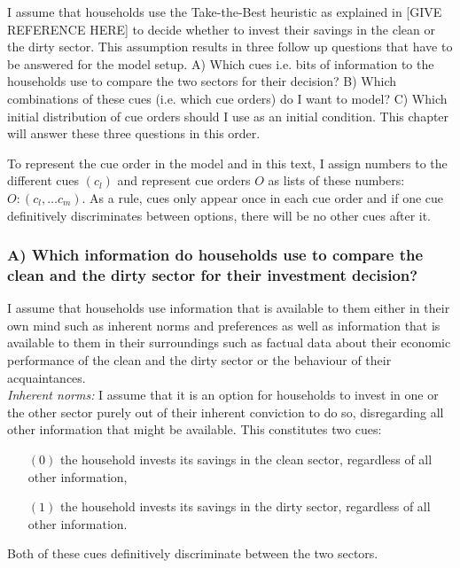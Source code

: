 I assume that households use the Take-the-Best heuristic as explained in [GIVE REFERENCE HERE] to decide whether to invest their savings in the clean or the dirty sector. This assumption results in three follow up questions that have to be answered for the model setup. A) Which cues i.e. bits of information to the households use to compare the two sectors for their decision? B) Which combinations of these cues (i.e. which cue orders) do I want to model? C) Which initial distribution of cue orders should I use as an initial condition. This chapter will answer these three questions in this order.

To represent the cue order in the model and in this text, I assign numbers to the different cues $(c_l)$ and represent cue orders $O$ as lists of these numbers: $O: (c_l,\dots c_m)$. As a rule, cues only appear once in each cue order and if one cue definitively discriminates between options, there will be no other cues after it.

\subsubsection*{A) Which information do households use to compare the clean and the dirty sector for their investment decision?}
I assume that households use information that is available to them either in their own mind such as inherent norms and preferences as well as information that is available to them in their surroundings such as factual data about their economic performance of the clean and the dirty sector or the behaviour of their acquaintances.\\

\textit{Inherent norms:}
I assume that it is an option for households to invest in one or the other sector purely out of their inherent conviction to do so, disregarding all other information that might be available. This constitutes two cues: 
\begin{itemize}
  \item [ $(0)$ ] the household invests its savings in the clean sector, regardless of all other information,
  \item [ $(1)$ ] the household invests its savings in the dirty sector, regardless of all other information.
\end{itemize}
Both of these cues definitively discriminate between the two sectors.\\

